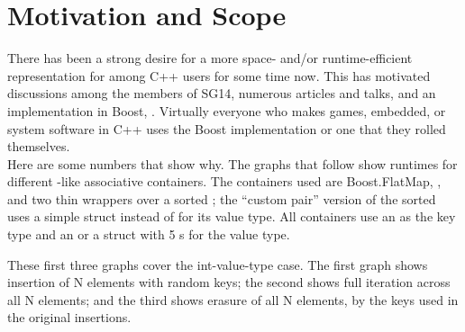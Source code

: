 \section{Motivation and Scope}

There has been a strong desire for a more space- and/or runtime-efficient
representation for  among C++ users for some time now.  This has
motivated discussions among the members of SG14, numerous articles and talks,
and an implementation in Boost, .  Virtually
everyone who makes games, embedded, or system software in C++ uses the Boost
implementation or one that they rolled themselves.\\

Here are some numbers that show why.  The graphs that follow show runtimes for
different -like associative containers.  The containers used are
Boost.FlatMap, , and two thin wrappers over a sorted
; the ``custom pair'' version of the sorted
 uses a simple struct instead of  for its
value type.  All containers use an  as the key type and an
 or a struct with 5 s for the value type.

These first three graphs cover the int-value-type case.  The first
graph shows insertion of N elements with random keys; the second shows full
iteration across all N elements; and the third shows erasure of all N
elements, by the keys used in the original insertions.

\begin{center}
\end{center}

